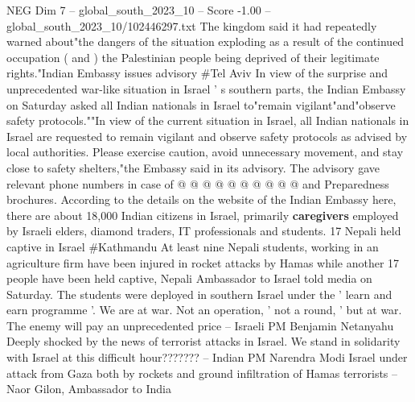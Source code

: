 \begin{textsample}{NEG Dim 7 – global\_south\_2023\_10 – Score -1.00 – global\_south\_2023\_10/102446297.txt}
The kingdom said it had repeatedly warned about"the dangers of the situation exploding as a result of the continued occupation ( and ) the Palestinian people being deprived of their legitimate rights."Indian Embassy issues advisory \#Tel Aviv In view of the surprise and unprecedented war-like situation in Israel ' s southern parts, the Indian Embassy on Saturday asked all Indian nationals in Israel to"remain vigilant"and"observe safety protocols.""In view of the current situation in Israel, all Indian nationals in Israel are requested to remain vigilant and observe safety protocols as advised by local authorities.
Please exercise caution, avoid unnecessary movement, and stay close to safety shelters,"the Embassy said in its advisory.
The advisory gave relevant phone numbers in case of @ @ @ @ @ @ @ @ @ @ and Preparedness brochures.
According to the details on the website of the Indian Embassy here, there are about 18,000 Indian citizens in Israel, primarily \textbf{caregivers} employed by Israeli elders, diamond traders, IT professionals and students. 17 Nepali held captive in Israel \#Kathmandu At least nine Nepali students, working in an agriculture firm have been injured in rocket attacks by Hamas while another 17 people have been held captive, Nepali Ambassador to Israel told media on Saturday.
The students were deployed in southern Israel under the ' learn and earn programme '.
We are at war.
Not an operation, ' not a round, ' but at war.
The enemy will pay an unprecedented price -- Israeli PM Benjamin Netanyahu Deeply shocked by the news of terrorist attacks in Israel.
We stand in solidarity with Israel at this difficult hour??????? -- Indian PM Narendra Modi Israel under attack from Gaza both by rockets and ground infiltration of Hamas terrorists -- Naor Gilon, Ambassador to India

\end{textsample}
